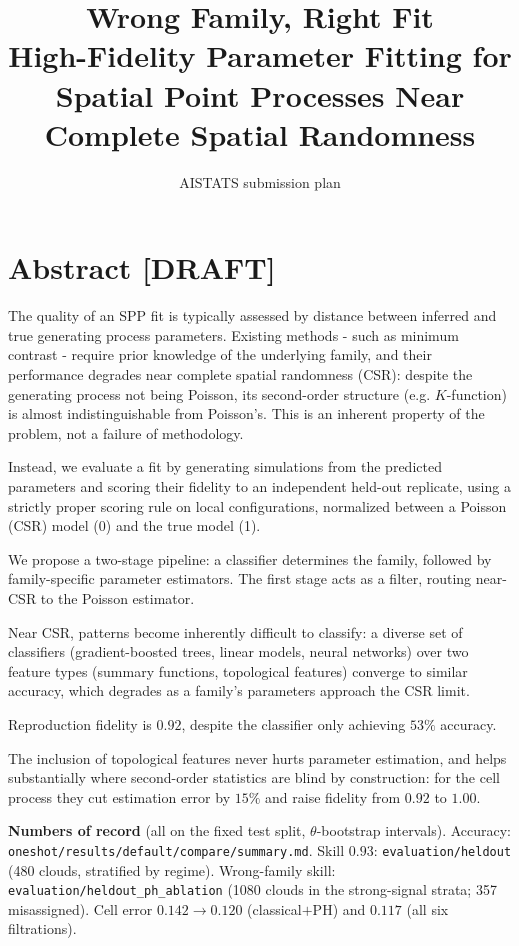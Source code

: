 \documentclass[11pt]{article}
\title{Wrong Family, Right Fit\\[2pt]
\large High-Fidelity Parameter Fitting for Spatial Point Processes Near Complete Spatial Randomness}
\author{AISTATS submission plan}
\date{}
\newcommand{\src}[1]{{\footnotesize\texttt{#1}}}
\begin{document}
\maketitle
\thispagestyle{empty}

\section*{Abstract [DRAFT]}

The quality of an SPP fit is typically assessed by distance between inferred and true generating process parameters. Existing methods - such as minimum contrast - require prior knowledge of the underlying family, and their performance degrades near complete spatial randomness (CSR): despite the generating process not being Poisson, its second-order structure (e.g. $K$-function) is almost indistinguishable from Poisson's. This is an inherent property of the problem, not a failure of methodology.

Instead, we evaluate a fit by generating simulations from the predicted parameters and scoring their fidelity to an independent held-out replicate, using a strictly proper scoring rule on local configurations, normalized between a Poisson (CSR) model (0) and the true model (1).

We propose a two-stage pipeline: a classifier determines the family, followed by family-specific parameter estimators. The first stage acts as a filter, routing near-CSR to the Poisson estimator.

Near CSR, patterns become inherently difficult to classify: a diverse set of classifiers (gradient-boosted trees, linear models, neural networks) over two feature types (summary functions, topological features) converge to similar accuracy, which degrades as a family's parameters approach the CSR limit.

Reproduction fidelity is $0.92$, despite the classifier only achieving $53\%$ accuracy.  

The inclusion of topological features never hurts parameter estimation, and helps substantially where second-order statistics are blind by construction: for the cell process they cut estimation error by $15\%$ and raise fidelity from $0.92$ to $1.00$.

\vfill
{\footnotesize
\textbf{Numbers of record} (all on the fixed test split, $\theta$-bootstrap intervals). Accuracy:
\src{oneshot/results/default/compare/summary.md}. Skill $0.93$: \src{evaluation/heldout} (480 clouds,
stratified by regime). Wrong-family skill: \src{evaluation/heldout\_ph\_ablation} (1080 clouds in the
strong-signal strata; 357 misassigned). Cell error $0.142\to0.120$ (classical$+$PH) and $0.117$ (all six filtrations).}
\end{document}
